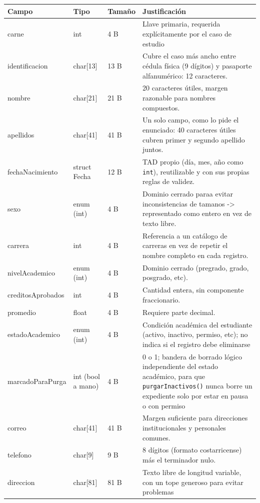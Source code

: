 \begin{longtable}{F{2.7cm} p{2.2cm} p{1.5cm} p{6.5cm}}
\toprule
Campo & Tipo & Tamaño & Justificación \\
\midrule
\endhead

carne &
int &
4 B &
Llave primaria, requerida explícitamente por el caso de estudio \\

identificacion &
char[13] &
13 B &
Cubre el caso más ancho entre cédula física (9 dígitos) y pasaporte alfanumérico: 12 caracteres. \\

nombre &
char[21] &
21 B &
20 caracteres útiles, margen razonable para nombres compuestos. \\

apellidos &
char[41] &
41 B &
Un solo campo, como lo pide el enunciado: 40 caracteres útiles cubren primer y segundo apellido juntos. \\

fechaNacimiento &
struct Fecha &
12 B &
TAD propio (día, mes, año como \texttt{int}), reutilizable y con sus propias reglas de validez. \\

sexo &
enum (int) &
4 B &
Dominio cerrado paraa evitar inconsistencias de tamanos -> representado como entero en vez de texto libre. \\

carrera &
int &
4 B &
Referencia a un catálogo de carreras en vez de repetir el nombre completo en cada registro. \\

nivelAcademico &
enum (int) &
4 B &
Dominio cerrado (pregrado, grado, posgrado, etc). \\

creditosAprobados &
int &
4 B &
Cantidad entera, sin componente fraccionario. \\

promedio &
float &
4 B &
Requiere parte decimal. \\

estadoAcademico &
enum (int) &
4 B &
Condición académica del estudiante (activo, inactivo, permiso, etc); no indica si el registro debe eliminarse \\

marcadoParaPurga &
int (bool a mano) &
4 B &
0 o 1; bandera de borrado lógico independiente del estado académico, para que \texttt{purgarInactivos()} nunca borre un expediente solo por estar en pausa o con permiso \\

correo &
char[41] &
41 B &
Margen suficiente para direcciones institucionales y personales comunes. \\

telefono &
char[9] &
9 B &
8 dígitos (formato costarricense) más el terminador nulo. \\

direccion &
char[81] &
81 B &
Texto libre de longitud variable, con un tope generoso para evitar problemas \\

\bottomrule
\end{longtable}
